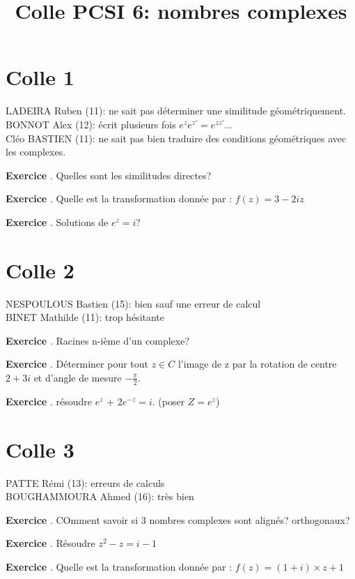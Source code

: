 \documentclass[10pt,a4paper]{article}
\title{Colle PCSI 6: nombres complexes}
\newcounter{question}
\newcounter{exo}
\newenvironment{exo}{\vspace{0.5cm}\setcounter{question}{0}\addtocounter{exo}{1} \noindent \textbf{Exercice \theexo}. \normalsize }{\par}
\begin{document}
	\maketitle

	\section*{Colle 1}
	LADEIRA Ruben (11): ne sait pas déterminer une similitude géométriquement. \\
	BONNOT Alex (12): écrit plusieurs fois $e^{z}e^{z'} = e^{z z'}$...\\
	Cléo BASTIEN (11): ne sait pas bien traduire des conditions géométriques avec les complexes.\\
	
	\begin{exo} 
		Quelles sont les similitudes directes?
	\end{exo}
	
	\begin{exo}
		Quelle est la transformation donnée par :
		$f (z) = 3 - 2iz$
	\end{exo}
	\begin{exo}
		Solutions de $e^z = i$?
	\end{exo}

	\section*{Colle 2}
	\setcounter{exo}{0}
	NESPOULOUS Bastien (15): bien sauf une erreur de calcul\\
	BINET Mathilde (11): trop hésitante\\
	
	\begin{exo}
		Racines n-ième d’un complexe?
	\end{exo}

	\begin{exo}
		Déterminer pour tout $z \in C$ l’image de z par la rotation de centre $2 + 3i$ et d’angle de mesure $-\frac{\pi}{2}$.
	\end{exo}
	
	\begin{exo}
		résoudre $e^z$ + 2$e^{-z} = i$. (poser $Z = e^z$)
	\end{exo}
	\section*{Colle 3}
	\setcounter{exo}{0}
	PATTE Rémi (13): erreurs de calculs\\
	BOUGHAMMOURA Ahmed (16): très bien\\
	
	\begin{exo}
		COmment savoir si 3 nombres complexes sont alignés? orthogonaux?
	\end{exo}
	
	\begin{exo}
		Résoudre $z^2 - z = i - 1$
	\end{exo}
	
	\begin{exo}
		Quelle est la transformation donnée par :
		$f (z) = (1 + i) \times z + 1$
	\end{exo}
\end{document}
